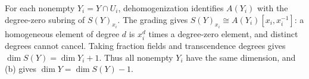 For each nonempty $Y_i=Y\cap U_i$, dehomogenization identifies $A(Y_i)$ with the degree-zero subring of $S(Y)_{x_i}$. The grading gives $S(Y)_{x_i}\cong A(Y_i)[x_i,x_i^{-1}]$: a homogeneous element of degree $d$ is $x_i^d$ times a degree-zero element, and distinct degrees cannot cancel. Taking fraction fields and transcendence degrees gives $\dim S(Y)=\dim Y_i+1$. Thus all nonempty $Y_i$ have the same dimension, and (b) gives $\dim Y=\dim S(Y)-1$.
